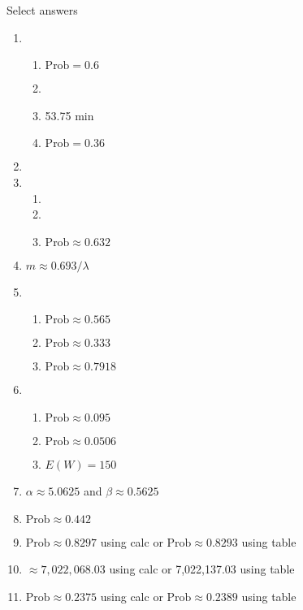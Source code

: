 \documentclass{article}
\begin{document}
\bigskip

Select answers\bigskip
\begin{enumerate}
    \item 
    \begin{enumerate}
        \item $\text{Prob} = 0.6$
        \item 
        \item 53.75 min
        \item $\text{Prob} = 0.36$
    \end{enumerate}
    
    \item 
    
    \item 
    \begin{enumerate}
        \item 
        \item 
        \item $\text{Prob} \approx 0.632$
    \end{enumerate}
      
    \item $m \approx 0.693 / \lambda$
    
    \item  
    \begin{enumerate}
        \item $\text{Prob} \approx 0.565$
        \item $\text{Prob} \approx 0.333$
        \item $\text{Prob} \approx 0.7918$
    \end{enumerate}
    
    \item  
    \begin{enumerate}
        \item $\text{Prob} \approx 0.095$
        \item $\text{Prob} \approx 0.0506$
        \item $E(W) = 150$
    \end{enumerate}
    
    \item $\alpha \approx 5.0625$ and $\beta \approx 0.5625$
    
    \item $\text{Prob} \approx 0.442$
    
    \item $\text{Prob} \approx 0.8297$ using calc or $\text{Prob} \approx 0.8293$ using table

    \item $\approx 7,022,068.03$ using calc or 7,022,137.03 using table
    
    \item $\text{Prob} \approx 0.2375$ using calc or $\text{Prob} \approx 0.2389$ using table


\end{enumerate}
    
\end{document}
